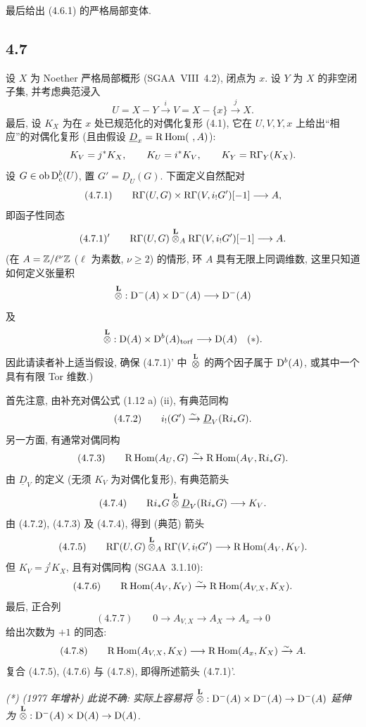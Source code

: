 最后给出 (4.6.1) 的严格局部变体.

\subsection*{4.7}
设 $X$ 为 Noether 严格局部概形 (SGAA~VIII~4.2), 闭点为 $x$. 设 $Y$ 为 $X$ 的非空闭子集, 并考虑典范浸入
\[
U=X-Y\xrightarrow{i}V=X-\{x\}\xrightarrow{j}X.
\]
最后, 设 $K_X$ 为在 $x$ 处已规范化的对偶化复形 (4.1), 它在 $U,V,Y,x$ 上给出“相应”的对偶化复形 (且由假设 $\underline{D}_x=\mathrm R\operatorname{Hom}(\ ,A)$):
\[
K_V=j^*K_X,
\qquad K_U=i^*K_V,
\qquad K_Y=\mathrm R\Gamma_Y(K_X).
\]
设 $G\in\operatorname{ob}\mathrm{D}_c^b(U)$, 置 $G'=\underline{D}_U(G)$. 下面定义自然配对
\[
(4.7.1)\qquad \mathrm R\Gamma(U,G)\times \mathrm R\Gamma(V,i_!G')[-1]\longrightarrow A,
\]
即函子性同态
\[
(4.7.1)'\qquad \mathrm R\Gamma(U,G)\overset{\mathbf L}{\otimes}_A\mathrm R\Gamma(V,i_!G')[-1]\longrightarrow A.
\]
(在 $A=\mathbb Z/\ell^\nu\mathbb Z$ ($\ell$ 为素数, $\nu\geqslant2$) 的情形, 环 $A$ 具有无限上同调维数, 这里只知道如何定义张量积
\[
\overset{\mathbf L}{\otimes}:\mathrm{D}^-(A)\times\mathrm{D}^-(A)\longrightarrow\mathrm{D}^-(A)
\]
及
\[
\overset{\mathbf L}{\otimes}:\mathrm{D}(A)\times\mathrm{D}^b(A)_{\mathrm{torf}}\longrightarrow\mathrm{D}(A)\quad(*).
\]
因此请读者补上适当假设, 确保 (4.7.1)' 中 $\overset{\mathbf L}{\otimes}$ 的两个因子属于 $\mathrm{D}^b(A)$, 或其中一个具有有限 Tor 维数.)

首先注意, 由补充对偶公式 (1.12 a) (ii), 有典范同构
\[
(4.7.2)\qquad i_!(G')\xrightarrow{\sim}\underline{D}_V(\mathrm R i_*G).
\]
另一方面, 有通常对偶同构
\[
(4.7.3)\qquad \mathrm R\operatorname{Hom}(A_U,G)\xrightarrow{\sim}\mathrm R\operatorname{Hom}(A_V,\mathrm R i_*G).
\]
由 $\underline{D}_V$ 的定义 (无须 $K_V$ 为对偶化复形), 有典范箭头
\[
(4.7.4)\qquad \mathrm R i_*G\overset{\mathbf L}{\otimes}\underline{D}_V(\mathrm R i_*G)\longrightarrow K_V.
\]
由 (4.7.2), (4.7.3) 及 (4.7.4), 得到 (典范) 箭头
\[
(4.7.5)\qquad \mathrm R\Gamma(U,G)\overset{\mathbf L}{\otimes}_A\mathrm R\Gamma(V,i_!G')\longrightarrow \mathrm R\operatorname{Hom}(A_V,K_V).
\]
但 $K_V=j^!K_X$, 且有对偶同构 (SGAA~3.1.10):
\[
(4.7.6)\qquad \mathrm R\operatorname{Hom}(A_V,K_V)\xrightarrow{\sim}\mathrm R\operatorname{Hom}(A_{V,X},K_X).
\]
最后, 正合列
\[
(4.7.7)\qquad 0\longrightarrow A_{V,X}\longrightarrow A_X\longrightarrow A_x\longrightarrow 0
\]
给出次数为 $+1$ 的同态:
\[
(4.7.8)\qquad \mathrm R\operatorname{Hom}(A_{V,X},K_X)\longrightarrow \mathrm R\operatorname{Hom}(A_x,K_X)\xrightarrow{\sim}A.
\]
复合 (4.7.5), (4.7.6) 与 (4.7.8), 即得所述箭头 (4.7.1)'.

\emph{(*) (1977 年增补) 此说不确: 实际上容易将 $\overset{\mathbf L}{\otimes}:\mathrm{D}^-(A)\times\mathrm{D}^-(A)\to\mathrm{D}^-(A)$ 延伸为 $\overset{\mathbf L}{\otimes}:\mathrm{D}^-(A)\times\mathrm{D}(A)\to\mathrm{D}(A)$.}


